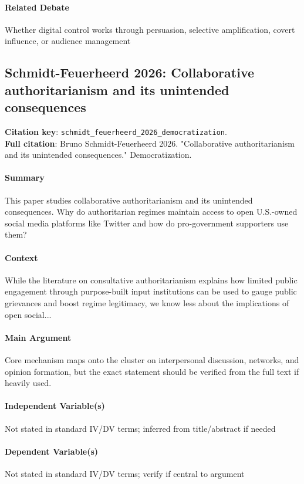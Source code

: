 \documentclass[12pt]{article}
\begin{document}
\paragraph{Related Debate} Whether digital control works through persuasion, selective amplification, covert influence, or audience management


\subsection{Schmidt-Feuerheerd 2026: Collaborative authoritarianism and its unintended consequences}
\textbf{Citation key}: \texttt{schmidt\_feuerheerd\_2026\_democratization}.\\
\textbf{Full citation}: Bruno Schmidt-Feuerheerd 2026. "Collaborative authoritarianism and its unintended consequences." Democratization.

\paragraph{Summary} This paper studies collaborative authoritarianism and its unintended consequences. Why do authoritarian regimes maintain access to open U.S.-owned social media platforms like Twitter and how do pro-government supporters use them?

\paragraph{Context} While the literature on consultative authoritarianism explains how limited public engagement through purpose-built input institutions can be used to gauge public grievances and boost regime legitimacy, we know less about the implications of open social...

\paragraph{Main Argument} Core mechanism maps onto the cluster on interpersonal discussion, networks, and opinion formation, but the exact statement should be verified from the full text if heavily used.

\paragraph{Independent Variable(s)} Not stated in standard IV/DV terms; inferred from title/abstract if needed

\paragraph{Dependent Variable(s)} Not stated in standard IV/DV terms; verify if central to argument
\end{document}
